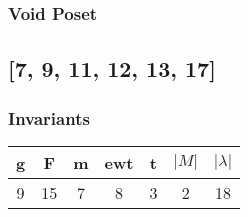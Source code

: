 \documentclass[a4paper]{article}
\begin{document}
\hfill\begin{minipage}{0.48\textwidth}
\subsubsection*{Void Poset}
\centering
{}
\end{minipage}
\newpage\subsection{[7, 9, 11, 12, 13, 17]}
\noindent\begin{minipage}{0.6\textwidth}
\subsubsection*{Invariants}
\centering
\begin{tabular}{|c|c|c|c|c|c|c|}
\toprule
g & F & m & ewt & t & \(|M|\) & \(|\lambda|\) \\
\midrule
9 & 15 & 7 & 8 & 3 & 2 & 18 \\
\bottomrule
\end{tabular}
\end{minipage}%
\end{document}
